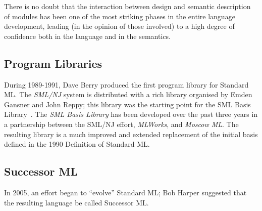 There is no doubt that the interaction between design and semantic description
of modules has been one of the most striking phases in the entire language
development, leading (in the opinion of those involved) to a high degree of
confidence both in the language and in the semantics.


\subsection*{Program Libraries}
 During 1989-1991, Dave Berry produced the first program library for
 Standard ML\cite{mllib91,berry93}.
 The {\em SML/NJ} system is distributed with a rich library organised by
 Emden Gansner and John Reppy; this library was the starting point for
 the SML Basis Library~.
 The {\em SML Basis Library\/}\cite{sml-basis-lib} has been developed 
 over the past three years in a
 partnership between the SML/NJ effort, {\em MLWorks}, and {\em Moscow ML}.
 The resulting library is a much improved and extended 
 replacement of the initial basis defined in the 1990 Definition of 
 Standard ML.

\subsection*{\protect\color{\addcolor} Successor ML}
{\color{\addcolor}
In 2005, an effort began to ``evolve'' Standard ML; Bob Harper suggested that the resulting language
be called Successor ML.
}

